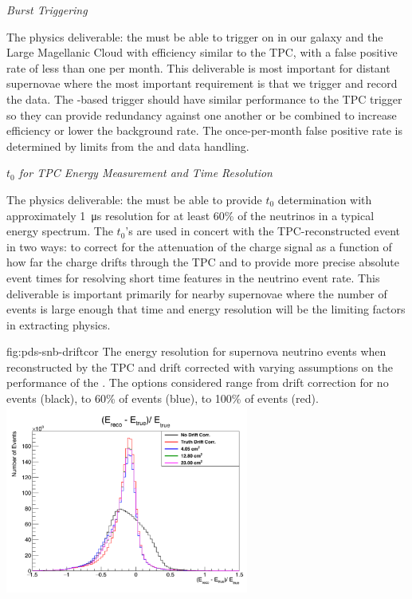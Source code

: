 \textit{Burst Triggering}

The physics deliverable: the  must be able to trigger on  in our galaxy and the Large Magellanic Cloud with efficiency similar to the TPC, with a false positive rate of less than one per month. This deliverable is most important for distant supernovae where the most important requirement is that we trigger and record the data. The -based trigger should have similar performance to the TPC trigger so they can provide redundancy against one another or be combined to increase efficiency or lower the background rate. The once-per-month false positive rate is determined by limits from the  and data handling.



\textit{$t_0$ for TPC Energy Measurement and Time Resolution}

The physics deliverable: the  must be able to provide $t_0$  determination with approximately \SI{1}{\micro s} resolution for at least 60\% of the neutrinos in a typical  energy spectrum. The $t_0$'s are used in concert with the TPC-reconstructed event in two ways: to correct for the attenuation of the charge signal as a function of how far the charge drifts through the TPC and to provide more precise absolute event times for resolving short time features in the  neutrino event rate. This deliverable is important primarily for nearby supernovae where the number of events is large enough that time and energy resolution will be the limiting factors in extracting physics. 

\begin{dunefigure}
{fig:pds-snb-driftcor}
{The energy resolution for supernova neutrino events when reconstructed by the TPC and drift corrected with varying assumptions on the performance of the . The options considered range from drift correction for no events (black), to 60\% of events (blue), to 100\% of events (red).}
  \includegraphics[width=0.6\textwidth]{graphics/pd-snb-tpc-eres}
\end{dunefigure}

